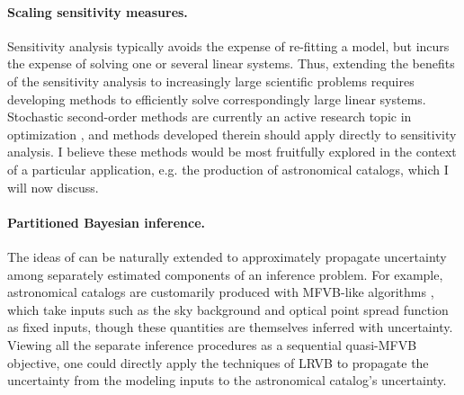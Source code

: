 
\paragraph{Scaling sensitivity measures.}

Sensitivity analysis typically avoids the expense of re-fitting a model, but
incurs the expense of solving one or several linear systems.  Thus, extending
the benefits of the sensitivity analysis to increasingly large scientific
problems requires developing methods to efficiently solve correspondingly large
linear systems.  Stochastic second-order methods are currently an active
research topic in optimization \citep{agarwal:2017:secondorder,
berahas:2020:newtonsketch}, and methods developed therein should apply
directly to sensitivity analysis.  I believe these methods would be most
fruitfully explored in the context of a particular application, e.g.
the production of astronomical catalogs, which I will now discuss.

\paragraph{Partitioned Bayesian inference.}

The ideas of \citep{giordano:2018:covariances} can be naturally extended to
approximately propagate uncertainty among separately estimated components of
an inference problem.  For example, astronomical catalogs are customarily
produced with MFVB-like algorithms \citep{lang:2016:tractor,
regier:2019:cataloging}, which take inputs such as the sky background
and optical point spread function as fixed inputs, though these quantities
are themselves inferred with uncertainty.  Viewing all the separate inference
procedures as a sequential quasi-MFVB objective, one could directly apply
the techniques of LRVB to propagate the uncertainty from the modeling inputs
to the astronomical catalog's uncertainty.



\newpage





